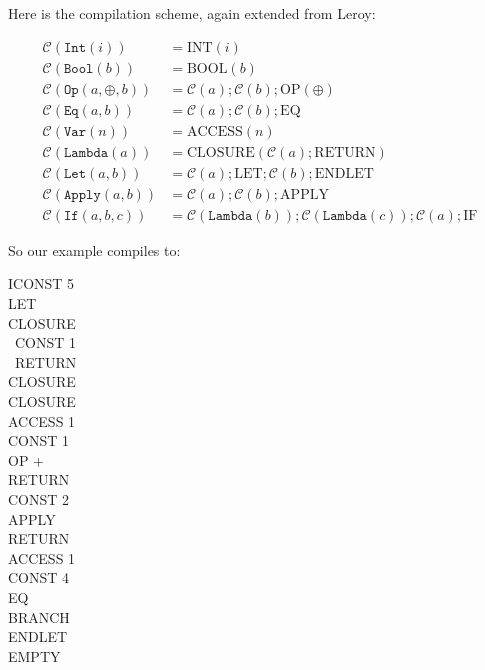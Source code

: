 \documentclass[11pt]{article}
\begin{document}
\noindent Here is the compilation scheme, again extended from Leroy:

\begin{align*}
\mathcal{C}(\texttt{Int}(i)) &= \text{INT}(i)\\
\mathcal{C}(\texttt{Bool}(b)) &= \text{BOOL}(b)\\
\mathcal{C}(\texttt{Op}(a, \oplus, b)) &= \mathcal{C}(a); \mathcal{C}(b); \text{OP}(\oplus)\\
\mathcal{C}(\texttt{Eq}(a, b)) &= \mathcal{C}(a); \mathcal{C}(b); \text{EQ}\\
\mathcal{C}(\texttt{Var}(n)) &= \text{ACCESS}(n)\\
\mathcal{C}(\texttt{Lambda}(a)) &= \text{CLOSURE}(\mathcal{C}(a); \text{RETURN})\\
\mathcal{C}(\texttt{Let}(a, b)) &= \mathcal{C}(a); \text{LET}; \mathcal{C}(b); \text{ENDLET}\\
\mathcal{C}(\texttt{Apply}(a, b)) &= \mathcal{C}(a); \mathcal{C}(b); \text{APPLY}\\
\mathcal{C}(\texttt{If}(a, b, c)) &= \mathcal{C}(\texttt{Lambda}(b)); \mathcal{C}(\texttt{Lambda}(c)); \mathcal{C}(a); \text{IF}
\end{align*}

\noindent So our example compiles to:

\medskip

\noindent ICONST 5\\
LET\\
CLOSURE\\
\phantom{\ \ }\ CONST 1\\
\phantom{\ \ }\ RETURN\\
CLOSURE\\
\phantom{\ \ } CLOSURE\\
\phantom{\ \ \ \ } ACCESS 1\\
\phantom{\ \ \ \ } CONST 1\\
\phantom{\ \ \ \ } OP +\\
\phantom{\ \ \ \ } RETURN\\
\phantom{\ \ } CONST 2\\
\phantom{\ \ } APPLY\\
\phantom{\ \ } RETURN\\
ACCESS 1\\
CONST 4\\
EQ\\
BRANCH\\
ENDLET\\
EMPTY

\medskip
\end{document}
